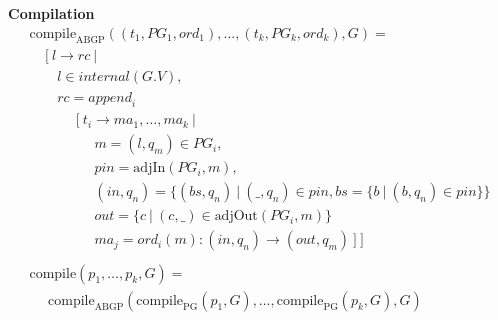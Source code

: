 \documentclass[twocolumn, openany]{sig-alternate-10pt}
\newcommand{\hdr}[2]{\flushleft \chdr{\hspace{5mm}#1}{#2}}
\newcommand{\chdr}[2]{\textbf{#1} {#2} \\ \centering}%
\begin{document}
\begin{figure*}[t!]
\begin{minipage}[t]{.46\linewidth}
  \end{minipage}
  \begin{minipage}[t]{.5\linewidth}
  \hdr{Compilation}{}
  \vspace*{-1\baselineskip}
  \[ \begin{array}{l}
     \text{compile}_\text{ABGP}( (t_1,PG_1,ord_1), \dots, (t_k,PG_k,ord_k), G ) = \\
     ~~~~~ [~ l \rightarrow rc ~\vert~ \\
     ~~~~~~~~~ l \in internal(G.V), \\
     ~~~~~~~~~ rc = \mathit{append}_i~  \\
     ~~~~~~~~~~~~~~~ [~ t_i \rightarrow ma_1, \dots, ma_k ~\vert~ \\
     ~~~~~~~~~~~~~~~~~~~~~ m = (l,q_m) \in PG_i, \\
     ~~~~~~~~~~~~~~~~~~~~~ pin = \text{adjIn}(PG_i,m), \\
     ~~~~~~~~~~~~~~~~~~~~~ (in,q_n) = \{ (bs,q_n) ~\vert~ (\_,q_n) \in pin, bs=\{b ~\vert~ (b,q_n) \in pin \} \} \\
     ~~~~~~~~~~~~~~~~~~~~~ out = \{ c ~\vert~ (c,\_) \in \text{adjOut}(PG_i,m) \} \\
     ~~~~~~~~~~~~~~~~~~~~~ ma_j = ord_i(m) : (in,q_n) \rightarrow (out,q_m) ~] ~] \\
     \\
     \text{compile}( p_1, \dots, p_k, G) = \\
     ~~~~~~ \text{compile}_\text{ABGP}(\text{compile}_\text{PG}(p_1,G), \dots, \text{compile}_\text{PG}(p_k,G), G) \\
  \end{array} \]%
  \end{minipage}%

  \vspace{1em}
  \vspace{1em}%


\end{figure*}
\end{document}
